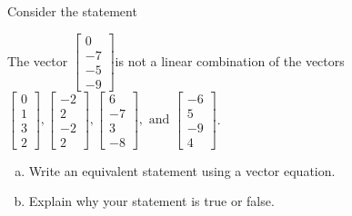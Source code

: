 
\begin{exerciseStatement}


Consider the statement 
\begin{center}\begin{minipage}{0.8\textwidth}
 The vector \( \left[\begin{array}{c}
0 \\
-7 \\
-5 \\
-9
\end{array}\right] \)is not a linear combination of the vectors \( \left[\begin{array}{c}
0 \\
1 \\
3 \\
2
\end{array}\right] , \left[\begin{array}{c}
-2 \\
2 \\
-2 \\
2
\end{array}\right] , \left[\begin{array}{c}
6 \\
-7 \\
3 \\
-8
\end{array}\right] , \text{ and } \left[\begin{array}{c}
-6 \\
5 \\
-9 \\
4
\end{array}\right] \). 
\end{minipage}\end{center}
    


\begin{enumerate}[(a)]
\item  Write an equivalent statement using a vector equation.
\item  Explain why your statement is true or false.
\end{enumerate}
    
\end{exerciseStatement}
    
